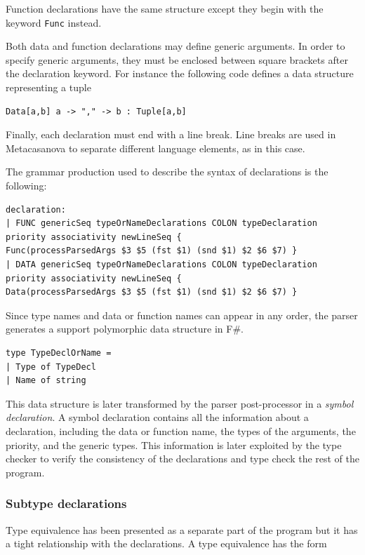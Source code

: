 Function declarations have the same structure except they begin with the keyword \texttt{Func} instead.

Both data and function declarations may define generic arguments. In order to specify generic arguments, they must be enclosed between square brackets after the declaration keyword. For instance the following code defines a data structure representing a tuple

\begin{lstlisting}
Data[a,b] a -> "," -> b : Tuple[a,b]
\end{lstlisting}

Finally, each declaration must end with a line break. Line breaks are used in Metacasanova to separate different language elements, as in this case.

The grammar production used to describe the syntax of declarations is the following:

\begin{lstlisting}
declaration:
| FUNC genericSeq typeOrNameDeclarations COLON typeDeclaration priority associativity newLineSeq {
Func(processParsedArgs $3 $5 (fst $1) (snd $1) $2 $6 $7) }
| DATA genericSeq typeOrNameDeclarations COLON typeDeclaration priority associativity newLineSeq {
Data(processParsedArgs $3 $5 (fst $1) (snd $1) $2 $6 $7) }
\end{lstlisting}

Since type names and data or function names can appear in any order, the parser generates a support polymorphic data structure in F\#.

\begin{lstlisting}
type TypeDeclOrName =
| Type of TypeDecl
| Name of string
\end{lstlisting}

This data structure is later transformed by the parser post-processor in a \textit{symbol declaration}. A symbol declaration contains all the information about a declaration, including the data or function name, the types of the arguments, the priority, and the generic types. This information is later exploited by the type checker to verify the consistency of the declarations and type check the rest of the program.

\subsubsection{Subtype declarations}
Type equivalence has been presented as a separate part of the program but it has a tight relationship with the declarations. A type equivalence has the form

